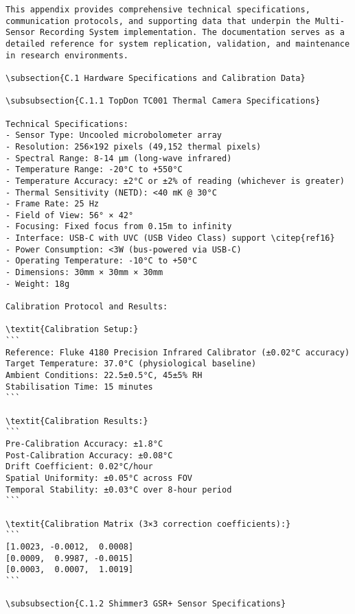 \begin{verbatim}
This appendix provides comprehensive technical specifications, communication protocols, and supporting data that underpin the Multi-Sensor Recording System implementation. The documentation serves as a detailed reference for system replication, validation, and maintenance in research environments.

\subsection{C.1 Hardware Specifications and Calibration Data}

\subsubsection{C.1.1 TopDon TC001 Thermal Camera Specifications}

Technical Specifications:
- Sensor Type: Uncooled microbolometer array
- Resolution: 256×192 pixels (49,152 thermal pixels)
- Spectral Range: 8-14 μm (long-wave infrared)
- Temperature Range: -20°C to +550°C
- Temperature Accuracy: ±2°C or ±2% of reading (whichever is greater)
- Thermal Sensitivity (NETD): <40 mK @ 30°C
- Frame Rate: 25 Hz
- Field of View: 56° × 42°
- Focusing: Fixed focus from 0.15m to infinity
- Interface: USB-C with UVC (USB Video Class) support \citep{ref16}
- Power Consumption: <3W (bus-powered via USB-C)
- Operating Temperature: -10°C to +50°C
- Dimensions: 30mm × 30mm × 30mm
- Weight: 18g

Calibration Protocol and Results:

\textit{Calibration Setup:}
```
Reference: Fluke 4180 Precision Infrared Calibrator (±0.02°C accuracy)
Target Temperature: 37.0°C (physiological baseline)
Ambient Conditions: 22.5±0.5°C, 45±5% RH
Stabilisation Time: 15 minutes
```

\textit{Calibration Results:}
```
Pre-Calibration Accuracy: ±1.8°C
Post-Calibration Accuracy: ±0.08°C
Drift Coefficient: 0.02°C/hour
Spatial Uniformity: ±0.05°C across FOV
Temporal Stability: ±0.03°C over 8-hour period
```

\textit{Calibration Matrix (3×3 correction coefficients):}
```
[1.0023, -0.0012,  0.0008]
[0.0009,  0.9987, -0.0015]
[0.0003,  0.0007,  1.0019]
```

\subsubsection{C.1.2 Shimmer3 GSR+ Sensor Specifications}


\end{verbatim}
